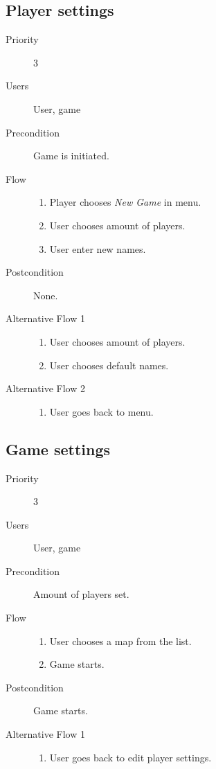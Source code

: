\documentclass[12pt,a4paper]{article}
\begin{document}
\subsection{Player settings}
\begin{description}
\item[Priority] 3
\item[Users] User, game
\item[Precondition] Game is initiated.
\item[Flow]\mbox{}
  \begin{enumerate}
  \item Player chooses \emph{New Game} in menu.
  \item User chooses amount of players.
  \item User enter new names.
  \end{enumerate}
\item[Postcondition] None.
\item[Alternative Flow 1]\mbox{}
  \begin{enumerate}
  \item User chooses amount of players.
  \item User chooses default names.
  \end{enumerate}
\item[Alternative Flow 2]\mbox{}
  \begin{enumerate}
  \item User goes back to menu.
  \end{enumerate}
\end{description}

\subsection{Game settings}
\begin{description}
\item[Priority] 3
\item[Users] User, game
\item[Precondition] Amount of players set.
\item[Flow]\mbox{}
  \begin{enumerate}
  \item User chooses a map from the list.
  \item Game starts.
  \end{enumerate}
\item[Postcondition] Game starts.
\item[Alternative Flow 1]\mbox{}
  \begin{enumerate}
  \item User goes back to edit player settings.
  \end{enumerate}
\end{description}
\end{document}
